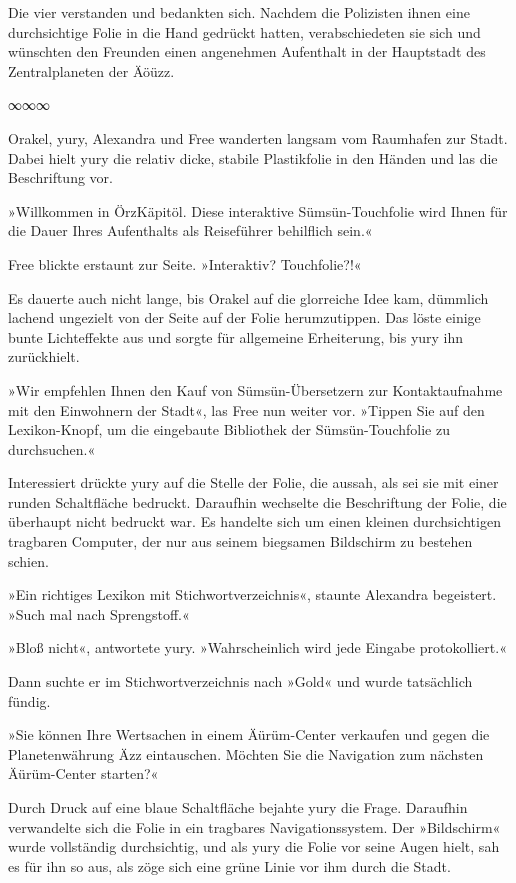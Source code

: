 Die vier verstanden und bedankten sich. Nachdem die Polizisten ihnen eine durchsichtige Folie in die Hand gedrückt hatten, verabschiedeten sie sich und wünschten den Freunden einen angenehmen Aufenthalt in der Hauptstadt des Zentralplaneten der Äöüzz.

\begin{center}
    ∞∞∞
\end{center}

Orakel, yury, Alexandra und Free wanderten langsam vom Raumhafen zur Stadt. Dabei hielt yury die relativ dicke, stabile Plastikfolie in den Händen und las die Beschriftung vor.

»Willkommen in ÖrzKäpitöl. Diese interaktive Sümsün-Touchfolie wird Ihnen für die Dauer Ihres Aufenthalts als Reiseführer behilflich sein.«

Free blickte erstaunt zur Seite. »Interaktiv? Touchfolie?!«

Es dauerte auch nicht lange, bis Orakel auf die glorreiche Idee kam, dümmlich lachend ungezielt von der Seite auf der Folie herumzutippen. Das löste einige bunte Lichteffekte aus und sorgte für allgemeine Erheiterung, bis yury ihn zurückhielt.

»Wir empfehlen Ihnen den Kauf von Sümsün-Übersetzern zur Kontaktaufnahme mit den Einwohnern der Stadt«, las Free nun weiter vor. »Tippen Sie auf den Lexikon-Knopf, um die eingebaute Bibliothek der Sümsün-Touchfolie zu durchsuchen.«

Interessiert drückte yury auf die Stelle der Folie, die aussah, als sei sie mit einer runden Schaltfläche bedruckt. Daraufhin wechselte die Beschriftung der Folie, die überhaupt nicht bedruckt war. Es handelte sich um einen kleinen durchsichtigen tragbaren Computer, der nur aus seinem biegsamen Bildschirm zu bestehen schien.

»Ein richtiges Lexikon mit Stichwortverzeichnis«, staunte Alexandra begeistert. »Such mal nach Sprengstoff.«

»Bloß nicht«, antwortete yury. »Wahrscheinlich wird jede Eingabe protokolliert.«

Dann suchte er im Stichwortverzeichnis nach »Gold« und wurde tatsächlich fündig.

»Sie können Ihre Wertsachen in einem Äürüm-Center verkaufen und gegen die Planetenwährung Äzz eintauschen. Möchten Sie die Navigation zum nächsten Äürüm-Center starten?«

Durch Druck auf eine blaue Schaltfläche bejahte yury die Frage. Daraufhin verwandelte sich die Folie in ein tragbares Navigationssystem. Der »Bildschirm« wurde vollständig durchsichtig, und als yury die Folie vor seine Augen hielt, sah es für ihn so aus, als zöge sich eine grüne Linie vor ihm durch die Stadt.

